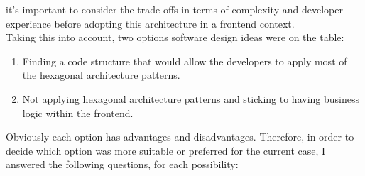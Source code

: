 \documentclass[../design.tex]{subfiles}
\begin{document}
it's important to consider the trade-offs in terms of complexity and developer
experience before adopting this architecture in a frontend context.
\\[8pt]
Taking this into account, two options software design ideas were on the table:
\begin{enumerate}
	\item Finding a code structure that would allow the developers to apply most
	      of the hexagonal architecture patterns.
	\item Not applying hexagonal architecture patterns and sticking to
	      having business logic within the frontend.
\end{enumerate}
Obviously each option has advantages and disadvantages. Therefore, in order to
decide which option was more suitable or preferred for the current case, I
answered the following questions, for each possibility:
\end{document}
